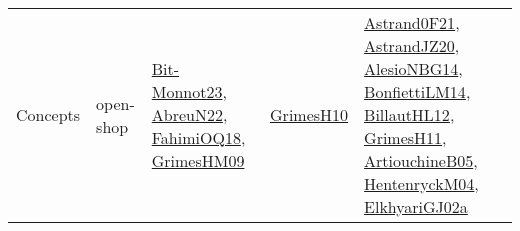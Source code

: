 {\begin{longtable}{lp{3cm}>{\raggedright}p{6cm}>{\raggedright}p{6cm}p{8cm}}
Concepts & open-shop & \href{papers/Bit-Monnot23.pdf}{Bit-Monnot23}\cite{Bit-Monnot23}, \href{articles/AbreuN22.pdf}{AbreuN22}\cite{AbreuN22}, \href{articles/FahimiOQ18.pdf}{FahimiOQ18}\cite{FahimiOQ18}, \href{papers/GrimesHM09.pdf}{GrimesHM09}\cite{GrimesHM09} & \href{papers/GrimesH10.pdf}{GrimesH10}\cite{GrimesH10} & \href{papers/Astrand0F21.pdf}{Astrand0F21}\cite{Astrand0F21}, \href{articles/AstrandJZ20.pdf}{AstrandJZ20}\cite{AstrandJZ20}, \href{papers/AlesioNBG14.pdf}{AlesioNBG14}\cite{AlesioNBG14}, \href{papers/BonfiettiLM14.pdf}{BonfiettiLM14}\cite{BonfiettiLM14}, \href{papers/BillautHL12.pdf}{BillautHL12}\cite{BillautHL12}, \href{papers/GrimesH11.pdf}{GrimesH11}\cite{GrimesH11}, \href{papers/ArtiouchineB05.pdf}{ArtiouchineB05}\cite{ArtiouchineB05}, \href{papers/HentenryckM04.pdf}{HentenryckM04}\cite{HentenryckM04}, \href{papers/ElkhyariGJ02a.pdf}{ElkhyariGJ02a}\cite{ElkhyariGJ02a}\\

\end{longtable}}
